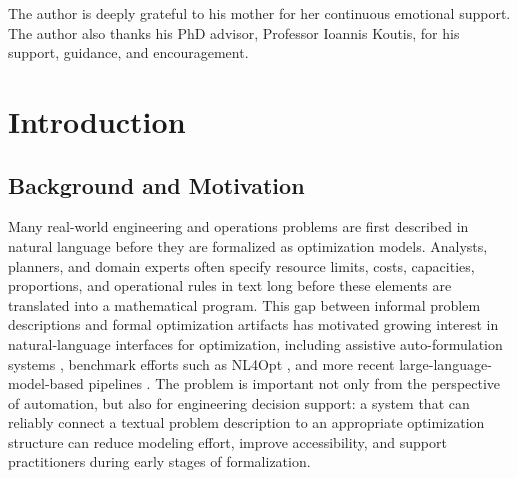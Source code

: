 \documentclass[pdflatex,sn-basic,Numbered]{sn-jnl}
\begin{document}
\maketitle


The author is deeply grateful to his mother for her continuous emotional support. The author also thanks his PhD advisor, Professor Ioannis Koutis, for his support, guidance, and encouragement.


\section{Introduction}

\subsection{Background and Motivation}
\label{subsec:intro_background}

Many real-world engineering and operations problems are first described in natural language before they are formalized as optimization models. Analysts, planners, and domain experts often specify resource limits, costs, capacities, proportions, and operational rules in text long before these elements are translated into a mathematical program. This gap between informal problem descriptions and formal optimization artifacts has motivated growing interest in natural-language interfaces for optimization, including assistive auto-formulation systems \cite{ramamonjison2022autoformulation}, benchmark efforts such as NL4Opt \cite{ramamonjison2023nl4opt}, and more recent large-language-model-based pipelines \cite{ahmaditeshnizi2024optimus_icml,zhang2024optllm,huang2024llmoptimization}. The problem is important not only from the perspective of automation, but also for engineering decision support: a system that can reliably connect a textual problem description to an appropriate optimization structure can reduce modeling effort, improve accessibility, and support practitioners during early stages of formalization.
\end{document}

